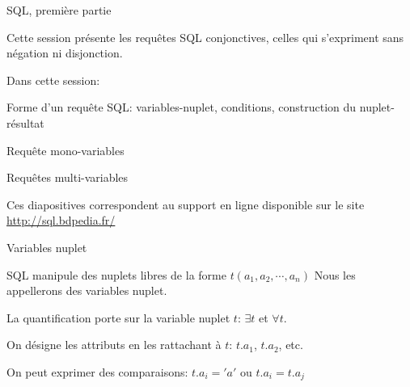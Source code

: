 
\begin{frame}[fragile]{SQL, première partie}

Cette session présente les requêtes SQL \alert{conjonctives}, celles
qui s'expriment  sans négation ni disjonction.

\vfill

Dans cette session:

\vfill

\begin{redbullet}
  \item Forme d'un  requête SQL: variables-nuplet, conditions, construction du nuplet-résultat
  \item Requête mono-variables
  \item Requêtes multi-variables
\end{redbullet}

\vfill
\begin{blocgauche}
\alert{Ces diapositives correspondent au support en ligne disponible sur
le site \url{http://sql.bdpedia.fr/}}
\end{blocgauche}

\end{frame}



\begin{frame}[fragile]{Variables nuplet}

SQL manipule des nuplets libres de la forme $t(a_1, a_2, \cdots, a_n)$
Nous les appellerons
des \alert{variables nuplet}.

\vfill

La quantification porte sur la variable nuplet $t$: $\exists t$ et $\forall t$.

\vfill

On désigne les attributs en les rattachant à $t$: $t.a_1$, $t.a_2$, etc.

\vfill

On  peut exprimer des comparaisons: $t.a_i = 'a'$ ou $t.a_i = t.a_j$

\end{frame}

